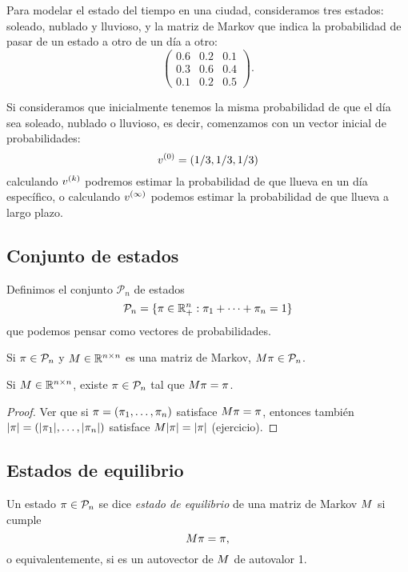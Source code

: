 \begin{ejemplo} Para modelar el estado del tiempo en una ciudad, consideramos tres estados: soleado, nublado y lluvioso, y la matriz de Markov que indica la probabilidad de pasar de un estado a otro de un día a otro:
$$
\begin{pmatrix}
0.6 & 0.2 & 0.1 \\
0.3 & 0.6 & 0.4 \\
0.1 & 0.2 & 0.5
\end{pmatrix}.
$$

Si consideramos que inicialmente tenemos la misma probabilidad de que el día sea soleado, nublado o lluvioso, es decir, comenzamos con un vector inicial de probabilidades:
$$
\vb^{(0)} = (1/3, 1/3, 1/3)
$$
calculando $\vb^{(k)}$ podremos estimar la probabilidad de que llueva en un día específico, o calculando $\vb^{(\infty)}$ podemos estimar la probabilidad de que llueva a largo plazo.
\end{ejemplo}

\subsection{Conjunto de estados}

Definimos el conjunto $\mathcal{P}_n$ de estados
$$
\mathcal{P}_n = \{\pib \in \R^n_+ : \pi_1 + \dots + \pi_n = 1\}
$$
que podemos pensar como vectores de probabilidades.

\begin{prop}
Si $\pib \in \mathcal{P}_n$ y $\Mb \in \Rnn$ es una matriz de Markov, $\Mb \pib \in \mathcal{P}_n$.
\end{prop}

\begin{prop}
Si $\Mb \in \Rnn$, existe $\pib \in \mathcal{P}_n$ tal que $\Mb \pib = \pib$.
\end{prop}

\begin{proof} Ver que si $\pib = (\pi_1, \dots, \pi_n)$ satisface $\Mb \pib = \pib$, entonces también
$|\pib| = (|\pi_1|, \dots, |\pi_n|)$ satisface $\Mb |\pib| = |\pib|$ (ejercicio).
\end{proof}

\subsection{Estados de equilibrio}

Un estado $\pib \in \mathcal{P}_n$ se dice \emph{estado de equilibrio} de una matriz de Markov $\Mb$ si cumple
$$
\Mb \pib = \pib,
$$
o equivalentemente, si es un autovector de $\Mb$ de autovalor 1.

